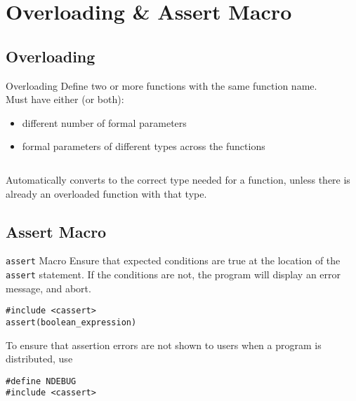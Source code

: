 \documentclass[\main/notes.tex]{subfiles}
\begin{document}
	\chapter{Overloading \& Assert Macro}
		\section{Overloading}
			\begin{definition}{Overloading}
				Define two or more functions with the same function name.\\
				Must have either (or both):
				\begin{itemize}[nosep]
					\item different number of formal parameters
					\item formal parameters of different types across the functions
				\end{itemize}
				\inputminted[bgcolor=definitionCode]{cpp}{\subfix{code/01_overload_example.cpp}}

				\noindent Automatically converts to the correct type needed for a function, unless there is already an overloaded function with that type.
			\end{definition}
		\section{Assert Macro}
			\begin{definition}{\texttt{assert} Macro}
				Ensure that expected conditions are true at the location of the \texttt{assert} statement. If the conditions are not, the program will display an error message, and abort.

				\begin{verbatim}
#include <cassert>
assert(boolean_expression)
				\end{verbatim}

				\noindent To ensure that assertion errors are not shown to users when a program is distributed, use
				\begin{verbatim}
#define NDEBUG
#include <cassert>
				\end{verbatim}
			\end{definition}

\end{document}
